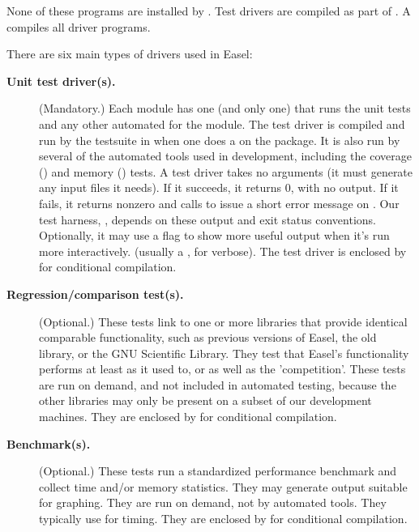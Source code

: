 None of these programs are installed by .  Test
drivers are compiled as part of .  A  compiles all driver programs.

There are six main types of drivers used in Easel:

\begin{description} 

\item[\textbf{Unit test driver(s).}] (Mandatory.) Each module has one (and only one)
   that runs the unit tests and any other automated for
  the module. The test driver is compiled and run by the testsuite in
   when one does a 
  on the package. It is also run by several of the automated tools
  used in development, including the coverage () and
  memory () tests. A test driver takes no arguments
  (it must generate any input files it needs). If it succeeds, it
  returns 0, with no output. If it fails, it returns nonzero and calls
   to issue a short error message on
  . Our test harness, , depends on these
  output and exit status conventions. Optionally, it may use a flag
  to show more useful output when it's run more interactively.
  (usually a , for verbose).
  The test driver is enclosed by
   for
  conditional compilation.

\item[\textbf{Regression/comparison test(s).}] (Optional.) These tests
  link to one or more libraries that provide identical comparable
  functionality, such as previous versions of Easel, the old
   library,  or the GNU Scientific Library.
  They test that Easel's functionality performs at least as it used
  to, or as well as the 'competition'. These tests are run on demand,
  and not included in automated testing, because the other libraries
  may only be present on a subset of our development machines. They
  are enclosed by  for conditional
  compilation.

\item[\textbf{Benchmark(s).}] (Optional.) These tests run a
  standardized performance benchmark and collect time and/or memory
  statistics. They may generate output suitable for graphing. They are
  run on demand, not by automated tools. They typically use 
   for timing. They are enclosed by
    for
  conditional compilation.


\end{description}
